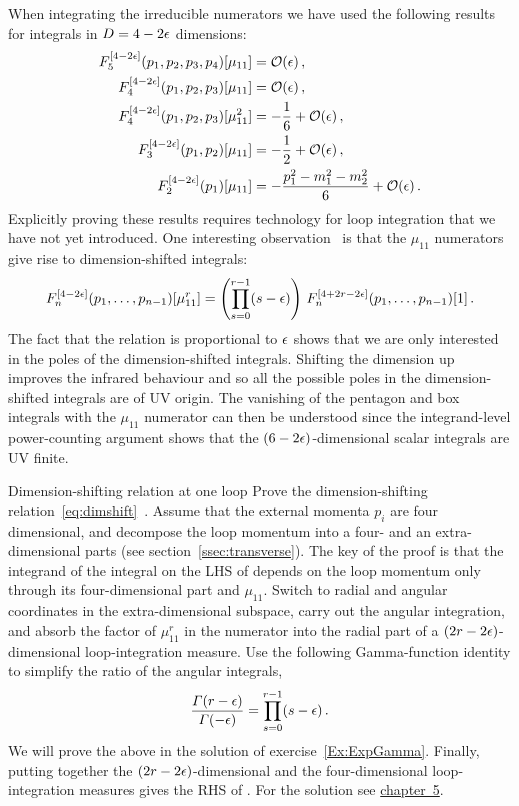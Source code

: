 When integrating the irreducible numerators we have used the following results for integrals in $D=4-2\epsilon$ dimensions:
\begin{align}
  F^{[4-2\epsilon]}_5(p_1,p_2,p_3,p_4)[\mu_{11}] &= \mathcal{O}(\epsilon) \,, \\
  F^{[4-2\epsilon]}_4(p_1,p_2,p_3)[\mu_{11}] &= \mathcal{O}(\epsilon) \,, \\
  F^{[4-2\epsilon]}_4(p_1,p_2,p_3)[\mu_{11}^2] &= -\frac{1}{6} + \mathcal{O}(\epsilon) \,, \\
  F^{[4-2\epsilon]}_3(p_1,p_2)[\mu_{11}] &= -\frac{1}{2} + \mathcal{O}(\epsilon) \,, \\
  F^{[4-2\epsilon]}_2(p_1)[\mu_{11}] &= -\frac{p_1^2-m_1^2-m_2^2}{6} + \mathcal{O}(\epsilon) \,.
\end{align}
Explicitly proving these results requires technology for loop integration that
we have not yet introduced. One interesting observation~\cite{ch3_Bern:1995db} is that the
$\mu_{11}$ numerators give rise to dimension-shifted integrals:
\begin{equation}
  F^{[4-2\epsilon]}_n(p_1,\ldots,p_{n-1})[\mu_{11}^r] = \left(\prod_{s=0}^{r-1}(s-\epsilon) \right) \, F^{[4+2r-2\epsilon]}_n(p_1,\ldots,p_{n-1})[1] \,.
  \label{eq:dimshift}
\end{equation}
The fact that the relation is proportional to $\epsilon$ shows that we are only
interested in the poles of the dimension-shifted integrals. Shifting the
dimension up improves the infrared behaviour and so all the possible poles in
the dimension-shifted integrals are of UV origin. The vanishing of the pentagon
and box integrals with the $\mu_{11}$ numerator can then be understood since the
integrand-level power-counting argument shows that the $(6-2\epsilon)$-dimensional scalar
integrals are UV finite.


\begin{exer}{Dimension-shifting relation at one loop}
\label{Ex:3.DimShift}
%
Prove the dimension-shifting relation~\eqref{eq:dimshift}~\cite{ch3_Bern:1995db}. Assume that the external momenta $p_i$ are four dimensional, and decompose the loop momentum into a four- and an extra-dimensional parts (see section~\ref{ssec:transverse}). The key of the proof is that the integrand of the integral on the LHS of  depends on the loop momentum only through its four-dimensional part and $\mu_{11}$.
Switch to radial and angular coordinates in the extra-dimensional subspace, carry out the angular integration, and absorb the factor of $\mu_{11}^r$ in the numerator into the radial part of a $(2r-2\epsilon)$-dimensional loop-integration measure. Use the following Gamma-function identity to simplify the ratio of the angular integrals,
\begin{align} \label{eq:gamma_ratio}
\frac{\Gamma(r-\eps)}{\Gamma(-\eps)} = \prod_{s=0}^{r-1} (s-\eps) \,.
\end{align}
We will prove the above in the solution of exercise~\ref{Ex:ExpGamma}. 
Finally, putting together the $(2r-2\epsilon)$-dimensional and the four-dimensional loop-integration measures gives the RHS of .
For the solution see \hyperref[Sol:3.DimShift]{chapter~5}.

\end{exer}



